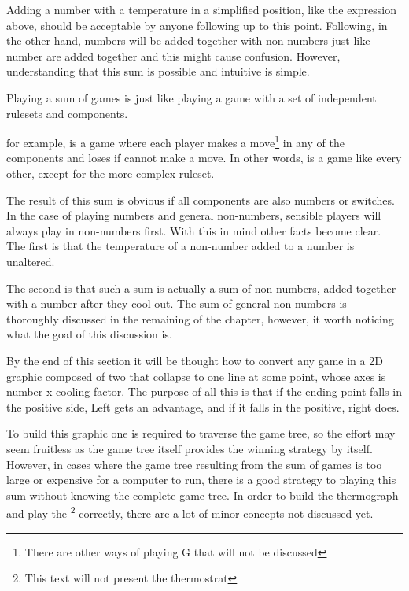 Adding a number with a temperature in a simplified position, like the expression above, should be acceptable by anyone following up to this point. Following, in the other hand, numbers will be added together with non-numbers just like number are added together and this might cause confusion. However, understanding that this sum is possible and intuitive is simple.

Playing a sum of games is just like playing a game with a set of independent rulesets and components. \begin{center}
\end{center}
for example, is a game where each player makes a move\footnote{There are other ways of playing G that will not be discussed} in any of the components and loses if cannot make a move. In other words, \Gm{} is a game like every other, except for the more complex ruleset.

The result of this sum is obvious if all components are also numbers or switches. In the case of playing numbers and general non-numbers, sensible players will always play in non-numbers first. With this in mind other facts become clear. The first is that the temperature of a non-number added to a number is unaltered.

The second is that such a sum is actually a sum of non-numbers, added together with a number after they cool out. The sum of general non-numbers is thoroughly discussed in the remaining of the chapter, however, it worth noticing what the goal of this discussion is.

By the end of this section it will be thought how to convert any game in a 2D graphic composed of two  that collapse to one line at some point, whose axes is number x cooling factor. The purpose of all this is that if the ending point falls in the positive side, Left gets an advantage, and if it falls in the positive, right does.

To build this graphic one is required to traverse the game tree, so the effort may seem fruitless as the game tree itself provides the winning strategy by itself. However, in cases where the game tree resulting from the sum of games is too large or expensive for a computer to run, there is a good strategy to playing this sum without knowing the complete game tree. In order to build the thermograph and play the \footnote{This text will not present the thermostrat} correctly, there are a lot of minor concepts not discussed yet.

